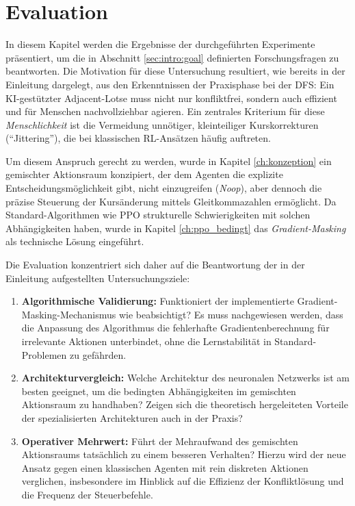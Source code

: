 \chapter{Evaluation}
\label{ch:evaluation}

In diesem Kapitel werden die Ergebnisse der durchgeführten Experimente präsentiert, um die in Abschnitt \ref{sec:intro:goal} definierten Forschungsfragen zu beantworten.
Die Motivation für diese Untersuchung resultiert, wie bereits in der Einleitung dargelegt, aus den Erkenntnissen der Praxisphase bei der \ac{DFS}: Ein KI-gestützter Adjacent-Lotse muss nicht nur konfliktfrei, sondern auch effizient und für Menschen nachvollziehbar agieren. Ein zentrales Kriterium für diese \emph{Menschlichkeit} ist die Vermeidung unnötiger, kleinteiliger Kurskorrekturen (\enquote{Jittering}), die bei klassischen \ac{RL}-Ansätzen häufig auftreten.
\medskip

Um diesem Anspruch gerecht zu werden, wurde in Kapitel \ref{ch:konzeption} ein gemischter Aktionsraum konzipiert, der dem Agenten die explizite Entscheidungsmöglichkeit gibt, nicht einzugreifen (\emph{Noop}), aber dennoch die präzise Steuerung der Kursänderung mittels Gleitkommazahlen ermöglicht. Da Standard-Algorithmen wie \ac{PPO} strukturelle Schwierigkeiten mit solchen Abhängigkeiten haben, wurde in Kapitel \ref{ch:ppo_bedingt} das \emph{Gradient\hyp{}Masking} als technische Lösung eingeführt.

Die Evaluation konzentriert sich daher auf die Beantwortung der in der Einleitung aufgestellten Untersuchungsziele:
\begin{enumerate}
    \item \textbf{Algorithmische Validierung:} Funktioniert der implementierte Gradient-Masking-Mechanismus wie beabsichtigt? Es muss nachgewiesen werden, dass die Anpassung des Algorithmus die fehlerhafte Gradientenberechnung für irrelevante Aktionen unterbindet, ohne die Lernstabilität in Standard\hyp{}Problemen zu gefährden.
    \item \textbf{Architekturvergleich:} Welche Architektur des neuronalen Netzwerks ist am besten geeignet, um die bedingten Abhängigkeiten im gemischten Aktionsraum zu handhaben? Zeigen sich die theoretisch hergeleiteten Vorteile der spezialisierten Architekturen auch in der Praxis?
    \item \textbf{Operativer Mehrwert:} Führt der Mehraufwand des gemischten Aktionsraums tatsächlich zu einem besseren Verhalten? Hierzu wird der neue Ansatz gegen einen klassischen Agenten mit rein diskreten Aktionen verglichen, insbesondere im Hinblick auf die Effizienz der Konfliktlösung und die Frequenz der Steuerbefehle.
\end{enumerate}

